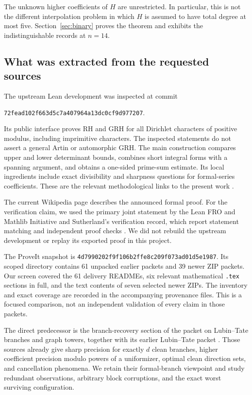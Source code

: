 \documentclass[11pt]{article}
\theoremstyle{definition}
\newcommand{\grhsha}{\texttt{72fead102f663d5c7a407964a13dc0cf9d977207}}
\newcommand{\pisha}{\texttt{4d7990202f9f106b2ffe8c209f073ad01d5e1987}}
\begin{document}
The unknown higher coefficients of $H$ are unrestricted. In particular, this is not the different interpolation problem in which $H$ is assumed to have total degree at most five. Section~\ref{sec:binary} proves the theorem and exhibits the indistinguishable records at $n=14$.

\subsection{What was extracted from the requested sources}

The upstream Lean development was inspected at commit
\begin{center}\small\grhsha.\end{center}
Its public interface proves RH and GRH for all Dirichlet characters of positive modulus, including imprimitive characters. The inspected statements do not assert a general Artin or automorphic GRH. The main construction compares upper and lower determinant bounds, combines short integral forms with a spanning argument, and obtains a one-sided prime-sum estimate. Its local ingredients include exact divisibility and sharpness questions for formal-series coefficients. These are the relevant methodological links to the present work \cite{sernau,guide,sharpness}.

The current Wikipedia page describes the announced formal proof. For the verification claim, we used the primary joint statement by the Lean FRO and Mathlib Initiative and Sutherland's verification record, which report statement matching and independent proof checks \cite{wiki,leanstatement,sutherland}. We did not rebuild the upstream development or replay its exported proof in this project.

The ProveIt snapshot is \pisha. Its scoped directory contains 61 unpacked earlier packets and 39 newer ZIP packets. Our screen covered the 61 delivery READMEs, six relevant mathematical \texttt{.tex} sections in full, and the text contents of seven selected newer ZIPs. The inventory and exact coverage are recorded in the accompanying provenance files. This is a focused comparison, not an independent validation of every claim in those packets.

The direct predecessor is the branch-recovery section of the packet on Lubin--Tate branches and graph towers, together with its earlier Lubin--Tate packet \cite{priorbranches,priorlt}. Those sources already give sharp precision for exactly $d$ clean branches, higher coefficient precision modulo powers of a uniformizer, optimal clean direction sets, and cancellation phenomena. We retain their formal-branch viewpoint and study redundant observations, arbitrary block corruptions, and the exact worst surviving configuration.
\end{document}
